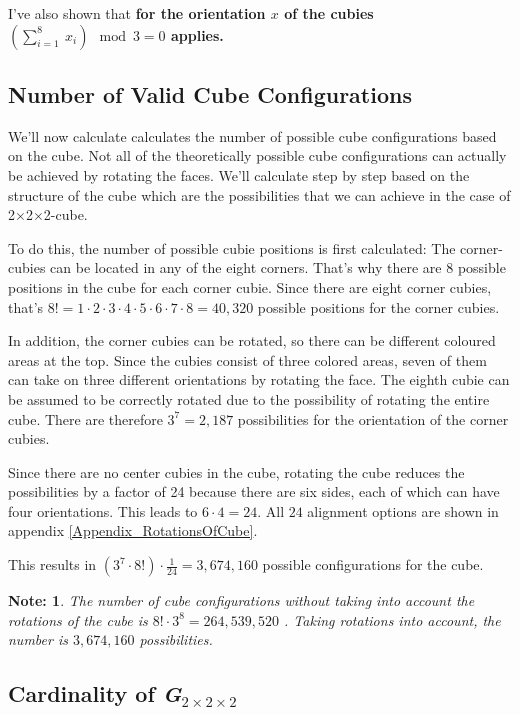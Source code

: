 \documentclass[12pt,a4paper]{article}
\theoremstyle{custom}
\newtheorem*{note}{Note:}
\newcommand{\Ttwo}{2$\times$2$\times$2-}
\begin{document}
I've also shown that \textbf{for the orientation $x$ of the cubies $( \sum_{i= 1}^{8} \ x_i ) \mod 3 = 0$ applies.}

\subsection{Number of Valid Cube Configurations}
\label{Section_NumberConfigurations}

We'll now calculate calculates the number of possible cube configurations based on the cube. Not all of the theoretically possible cube configurations can actually be achieved by rotating the faces. We'll calculate step by step based on the structure of the cube which are the possibilities that we can achieve in the case of  \Ttwo cube. 

To do this, the number of possible cubie positions is first calculated:
The corner-cubies can be located in any of the eight corners. That's why there are 8 possible positions in the cube for each corner cubie. Since there are eight corner cubies, that's $8! = 1 \cdot 2 \cdot 3 \cdot 4 \cdot 5 \cdot 6 \cdot 7 \cdot 8 = 40,320$ possible positions for the corner cubies.

In addition, the corner cubies can be rotated, so there can be different coloured areas at the top. Since the cubies consist of three colored areas, seven of them can take on three different orientations by rotating the face. The eighth cubie can be assumed to be correctly rotated due to the possibility of rotating the entire cube. There are therefore $3^7 = 2,187$ possibilities for the orientation of the corner cubies.

Since there are no center cubies in the cube, rotating the cube reduces the possibilities by a factor of 24 because there are six sides, each of which can have four orientations. This leads to $6 \cdot 4 = 24$.
All $24$ alignment options are shown in appendix \ref{Appendix_RotationsOfCube}.

This results in $(3^7 \cdot 8!) \cdot \frac{1}{24} = 3, 674, 160$ possible configurations for the cube.

\begin{note}
The number of cube configurations without taking into account the rotations of the cube is $8! \cdot 3^8 = 264, 539 , 520$ \cite{MMFAA}. Taking rotations into account, the number is $3, 674, 160$ possibilities.
\end{note}

\subsection{Cardinality of \textit{G}$_{2 \times 2 \times 2}$} 
\end{document}
